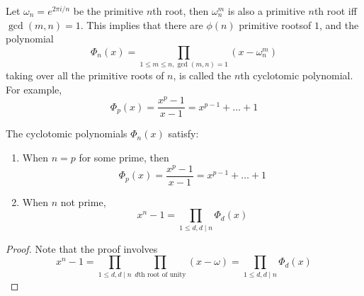 \documentclass[openany]{book}
\newcommand{\F}{\mathbb{F}}
\newcommand{\om}{\omega}
\begin{document}







\begin{defn}
    Let $\om_n=e^{2\pi i/n}$ be the primitive $n$th root, then $\om_n^m$ is also a primitive $n$th root iff $\gcd(m,n)=1$. This implies that there are $\phi(n)$ primitive rootsof $1$, and the polynomial 
    \begin{equation*}
        \Phi_n(x)=\prod_{1\leq m\leq n, \gcd(m,n)=1}(x-\om_n^m)
    \end{equation*}
    taking over all the primitive roots of $n$, is called the $n$th cyclotomic polynomial. For example, 
    \begin{equation*}
        \Phi_p(x)=\frac{x^p-1}{x-1}=x^{p-1}+\dots+1
    \end{equation*}
\end{defn}


\begin{prop}
    The cyclotomic polynomials $\Phi_n(x)$ satisfy:
    \begin{enumerate}
        \item When $n=p$ for some prime, then 
        \begin{equation*}
            \Phi_p(x)=\frac{x^p-1}{x-1}=x^{p-1}+\dots+1
        \end{equation*}
        \item When $n$ not prime, 
        \begin{equation*}
            x^n-1=\prod_{1\leq d, d \mid n} \Phi_d(x)
        \end{equation*}
    \end{enumerate}
\end{prop}
\begin{proof}
    Note that the proof involves 
    \begin{equation*}
        x^n-1=\prod_{1\leq d, d\mid n}\prod_{d\text{th root of unity}}(x-\om)=\prod_{1\leq d, d\mid n}\Phi_d(x)
    \end{equation*}
\end{proof}
\end{document}
